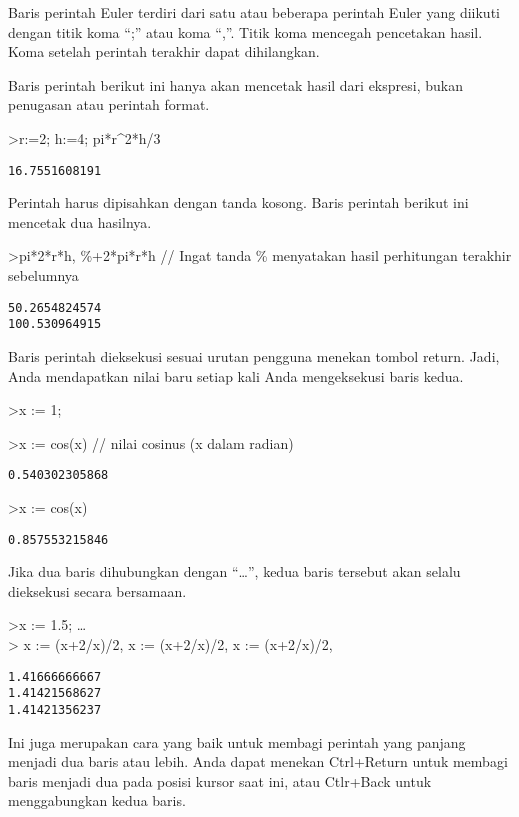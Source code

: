 \documentclass[
]{book}
\begin{document}
Baris perintah Euler terdiri dari satu atau beberapa perintah Euler yang diikuti dengan titik koma ``;'' atau koma ``,''. Titik koma mencegah pencetakan hasil. Koma setelah perintah terakhir dapat dihilangkan.

Baris perintah berikut ini hanya akan mencetak hasil dari ekspresi, bukan penugasan atau perintah format.

\textgreater r:=2; h:=4; pi*r\^{}2*h/3

\begin{verbatim}
16.7551608191
\end{verbatim}

Perintah harus dipisahkan dengan tanda kosong. Baris perintah berikut ini mencetak dua hasilnya.

\textgreater pi*2*r*h, \%+2*pi*r*h // Ingat tanda \% menyatakan hasil perhitungan terakhir sebelumnya

\begin{verbatim}
50.2654824574
100.530964915
\end{verbatim}

Baris perintah dieksekusi sesuai urutan pengguna menekan tombol return. Jadi, Anda mendapatkan nilai baru setiap kali Anda mengeksekusi baris kedua.

\textgreater x := 1;

\textgreater x := cos(x) // nilai cosinus (x dalam radian)

\begin{verbatim}
0.540302305868
\end{verbatim}

\textgreater x := cos(x)

\begin{verbatim}
0.857553215846
\end{verbatim}

Jika dua baris dihubungkan dengan ``\ldots{}'', kedua baris tersebut akan selalu dieksekusi secara bersamaan.

\textgreater x := 1.5; \ldots{}\\
\textgreater{} x := (x+2/x)/2, x := (x+2/x)/2, x := (x+2/x)/2,

\begin{verbatim}
1.41666666667
1.41421568627
1.41421356237
\end{verbatim}

Ini juga merupakan cara yang baik untuk membagi perintah yang panjang menjadi dua baris atau lebih. Anda dapat menekan Ctrl+Return untuk membagi baris menjadi dua pada posisi kursor saat ini, atau Ctlr+Back untuk menggabungkan kedua baris.
\end{document}
